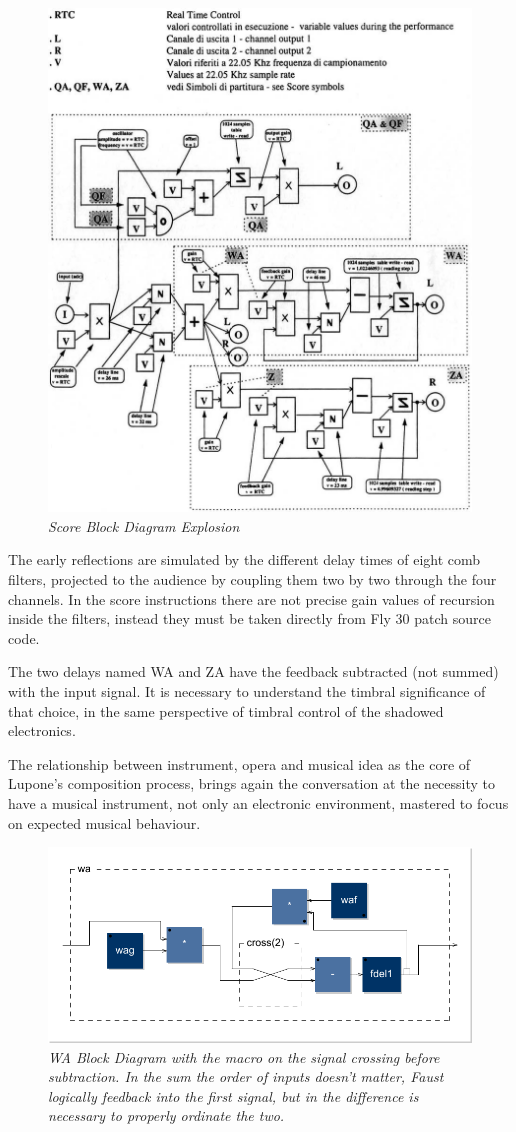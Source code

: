 \documentclass[twoside,a4paper]{article}
\begin{document}
\begin{figure}[ht]
\centerline{\includegraphics[width=.45\textwidth]{img/2-comp}}
\caption{\label{ml-dia-exp}{\it Score Block Diagram Explosion}}
\end{figure}

The early reflections are simulated by the different delay times of eight comb filters, projected to the audience by coupling them two by two through the four channels. In the score instructions there are not precise gain values of recursion inside the filters, instead they must be taken directly from Fly 30 patch source code.

The two delays named WA and ZA have the feedback subtracted (not summed) with the input signal. It is necessary to understand the timbral significance of that choice, in the same perspective of timbral control of the shadowed electronics. 

The relationship between instrument, opera and musical idea as the core of Lupone's composition process, brings again the conversation at the necessity to have a musical instrument, not only an electronic environment, mastered to focus on expected musical behaviour. 



\begin{figure}[ht]
\centerline{\includegraphics[width=.45\textwidth]{img/wa}}
\caption{\label{wa-block}{\it WA Block Diagram with the macro on the signal crossing before subtraction. In the sum the order of inputs doesn't matter, Faust logically feedback into the first signal, but in the difference is necessary to properly ordinate the two.}}
\end{figure}
\end{document}
